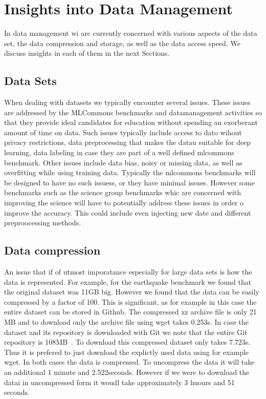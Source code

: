 \section{Insights into Data Management}

In data management wi are currently concerned with various aspects of
the data set, the data compression and storage, as well as the data
access speed. We discuss insights in each of them in the next Sections.

\subsection{Data Sets}

When dealing with datasets we typically encounter several issues.
These issues are addressed by the MLCommons benchmarks and
datamanagement activities so that they provide ideal candidates for
education without spending an exorberant amount of time on data. Such
issues typically include access to dato wihout privacy restrictions,
data preprocessing that makes the datau suitable for deep learning,
data labeling in case they are part of a well defined mlcommons
benchmark. Other issues include data bias, noisy or missing data, as
well as overfitting while using training data. Typically the mlcommons
benchmarks will be designed to have no such issuess, or they have
minimal issues. However some benchmarks such as the science group
benchmarks whic are concerned with improving the science will have to
potentially address these issues in order o improve the accuracy. This
could include even injecting new date and different preproocessing
methods.


\subsection{Data compression}

An issue that if of utmost imporatance especially for large data sets
is how the data is represented. For example, for the earthquake
benchmark we found that the original dataset was 11GB big. However we
found that the data can be easily compressed by a factor of 100. This
is significant, as for example in this case the entire dataset can be
stored in Github. The compressed xz archive file is only 21 MB and to
download only the archive file using wget takes 0.253s. In case the
dataset and its repository is downloaded with Git we note that the
entire Git repository is 108MB~\citep{mlcommons-earthquake-data}. To
download this compressed dataset only takes 7.723s. Thus it is
prefered to just download the explictly used data using for example
wget. In both cases the data is compressed. To uncompress the data it
will take an additional 1 minute and 2.522seconds. However if we were
to download the datai in uncompressed form it woudl take approximately
3 huours and 51 seconds.

